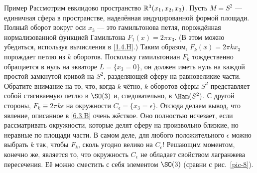 \begin{ex}{Пример}\label{6.3.C}
Рассмотрим евклидово пространство $\mathbb{R}^3 (x_1, x_2, x_3)$.
Пусть $M = S^2$ — единичная сфера в пространстве, наделённая
индуцированной формой площади. 
Полный оборот вокруг оси $x_3$ — это гамильтонова петля, порождённая
нормализованной функцией Гамильтона $F_1 (x) = 2\pi x_3$. 
(В этом можно убедиться, используя вычисления в \ref{1.4.H}.)
Таким образом, $F_k (x) = 2\pi k x_3$ порождает петлю из $k$ оборотов.
Поскольку гамильтониан $F_k$ тождественно обращается в нуль на экваторе $L = \{x_3
= 0\}$, он должен иметь нуль на каждой простой
замкнутой кривой на $S^2$, разделяющей сферу на равновеликие части. 
Обратите внимание на то, что, когда $k$ чётно, $k$ оборотов сферы
$S^2$ представляет собой стягиваемую петлю в $\SO (3)$ и,
следовательно, в $\Ham (S^2)$. 
С другой стороны, $F_k \equiv 2\pi k\epsilon$ на окружности
$C_\epsilon = \{x_3 = \epsilon\}$. 
Отсюда делаем вывод, что явление, описанное в \ref{6.3.B} очень жёсткое.
Оно полностью исчезает, если рассматривать окружности, которые делят
сферу на произвольно близкие, но неравные по площади части. 
В самом деле, для любого положительного $\epsilon$ можно выбрать $k$ так,
чтобы $F_k$, сколь угодно велико на $C_\epsilon$!
Решающим моментом, конечно же, является то, что окружность
$C_\epsilon$ не обладает свойством лагранжева пересечения. 
Её можно сместить с себя элементом $\SO (3)$ (сравни с рис.~\ref{pic-8}). 
\end{ex}
